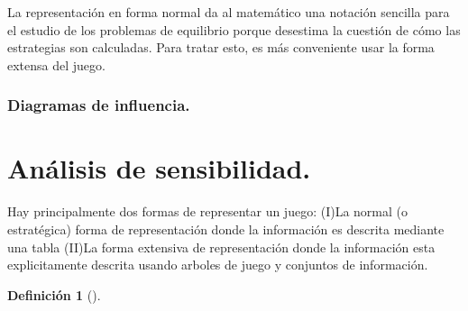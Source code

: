 \documentclass[a4paper]{report} %
\newtheorem{definicion}{Definición}[section]
\begin{document}
La representación en forma normal da al matemático una notación sencilla para el estudio de los problemas de equilibrio porque desestima la cuestión de cómo las estrategias son calculadas. Para tratar esto, es más conveniente usar la forma extensa del juego. 

\subsubsection{Diagramas de influencia.}





\section{Análisis de sensibilidad.}
Hay principalmente dos formas de representar un juego:
(I)La normal (o estratégica) forma de representación donde la información es descrita mediante una tabla
(II)La forma extensiva de representación donde la información esta explicitamente descrita usando arboles de juego y conjuntos de información.

\begin{definicion}[]

\end{definicion}






\newpage

\end{document}
